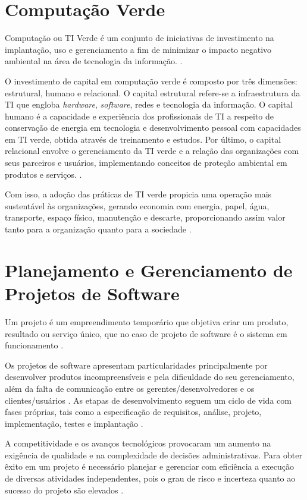 \section{Computação Verde}

Computação ou TI Verde é um conjunto de iniciativas de investimento na implantação, uso e gerenciamento a fim de minimizar o impacto negativo ambiental na área de tecnologia da informação. \cite{CQP_MMD_2020}.

O investimento de capital em computação verde é composto por três dimensões: estrutural, humano e relacional.
O capital estrutural refere-se a infraestrutura da TI que engloba \textit{hardware}, \textit{software}, redes e tecnologia da informação. O capital humano é a capacidade e experiência dos profissionais de TI a respeito de conservação de energia em tecnologia e desenvolvimento pessoal com capacidades em TI verde, obtida através de treinamento e estudos. Por último, o capital relacional envolve o gerenciamento da TI verde e a relação das organizações com seus parceiros e usuários, implementando conceitos de proteção ambiental em produtos e serviços. \cite{CQP_MMD_2020}.

Com isso, a adoção das práticas de TI verde propicia uma operação mais sustentável às organizações, gerando economia com energia, papel, água, transporte, espaço físico, manutenção e descarte, proporcionando assim valor tanto para a organização quanto para a sociedade \cite{TallesMoura2017}.

\section{Planejamento e Gerenciamento de Projetos de Software}

Um projeto é um empreendimento temporário que objetiva criar um produto, resultado ou serviço único, que no caso de projeto de software é o sistema em funcionamento \cite{Julia_Mara_2018}.

Os projetos de software apresentam particularidades principalmente por desenvolver produtos incompreensíveis e pela dificuldade do seu gerenciamento, além da falta de comunicação entre os gerentes/desenvolvedores e os clientes/usuários \cite{Prado1999}. As etapas de desenvolvimento seguem um ciclo de vida com fases próprias, tais como a especificação de requisitos, análise, projeto, implementação, testes e implantação \cite{Ralf_Teresa_Erica2018}.

A competitividade e os avanços tecnológicos provocaram um aumento na exigência de qualidade e na complexidade de decisões administrativas. Para obter êxito em um projeto é necessário planejar e gerenciar com eficiência a execução de diversas atividades independentes, pois o grau de risco e incerteza quanto ao sucesso do projeto são elevados \cite{Maria_Isabel_2001}.

